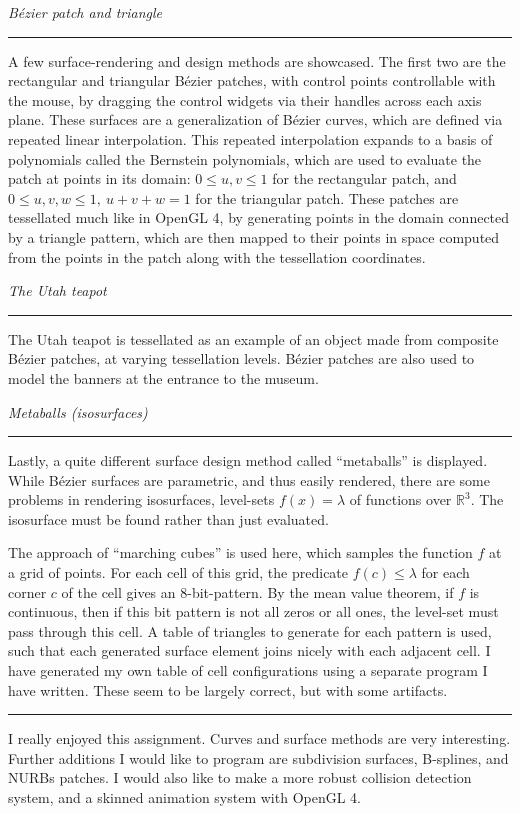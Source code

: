 \documentclass{article}
\newcommand{\reals}{\mathbb{R}}
\begin{document}
\vskip 0.1cm
\textit{B\'ezier patch and triangle}
\vskip 0.1cm
\hrule
\vskip 0.2cm
A few surface-rendering and design methods are showcased. The first two are
the rectangular and triangular B\'ezier patches, with control points controllable with the mouse, by
dragging the control widgets via their handles across each axis plane. These surfaces are a generalization
of B\'ezier curves, which are defined via repeated linear interpolation. This repeated interpolation expands to
a basis of polynomials called the Bernstein polynomials, which are used to evaluate the patch at points in its domain:
$0 \leq u,v \leq 1$ for the rectangular patch, and $0 \leq u,v,w \leq 1,\ u + v + w = 1$ for the triangular patch.
These patches are tessellated much like in OpenGL 4, by generating points in the domain connected by a triangle pattern,
which are then mapped to their points in space computed from the points in the patch along with the tessellation coordinates.

\vskip 0.1cm
\textit{The Utah teapot}
\vskip 0.1cm
\hrule
\vskip 0.2cm
The Utah teapot is tessellated as an example of an object made from composite B\'ezier patches, at varying tessellation levels. B\'ezier patches
are also used to model the banners at the entrance to the museum.

\vskip 0.1cm
\textit{Metaballs (isosurfaces)}
\vskip 0.1cm
\hrule
\vskip 0.2cm
Lastly, a quite different surface design method called ``metaballs'' is displayed. While B\'ezier surfaces are parametric,
and thus easily rendered, there are some problems in rendering isosurfaces, level-sets $f(x) = \lambda$ of functions over $\reals^3$. The isosurface
must be found rather than just evaluated.

The approach of ``marching cubes'' is used here, which samples the function $f$
at a grid of points. For each cell of this grid, the predicate $f(c) \leq \lambda$ for each corner $c$
of the cell gives an 8-bit-pattern. By the mean value theorem, if $f$ is continuous, then if this bit pattern is not all zeros or all ones,
the level-set must pass through this cell. A table of triangles to generate for each pattern is used, such that each generated surface element
joins nicely with each adjacent cell. I have generated my own table of cell configurations using a separate program I have written. These seem to be largely correct, but
with some artifacts.

\vskip 0.2in
\hrule
\vskip 0.2in
I really enjoyed this assignment. Curves and surface methods are very interesting. Further additions I would like to program are subdivision surfaces, B-splines, and NURBs patches. I would also like to make a more
robust collision detection system, and a skinned animation system with OpenGL 4.
\end{document}

